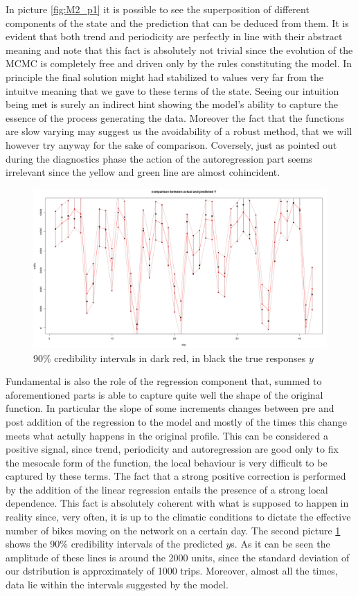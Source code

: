 \documentclass[11pt,twoside]{report}
\begin{document}
In picture \ref{fig:M2_p1} it is possible to see the superposition of different components of the state and the prediction that can be deduced from them. It is evident that both trend and periodicity are perfectly in line with their abstract meaning and note that this fact is absolutely not trivial since the evolution of the MCMC is completely free and driven only by the rules constituting the model. In principle the final solution might had stabilized to values very far from the intuitve meaning that we gave to these terms of the state. Seeing our intuition being met is surely an indirect hint showing the model's ability to capture the essence of the process generating the data. Moreover the fact that the functions are slow varying may suggest us the avoidability of a robust method, that we will however try anyway for the sake of comparison. Coversely, just as pointed out during the diagnostics phase the action of the autoregression part seems irrelevant since the yellow and green line are almost cohincident. 
\begin{figure}[H]
		\centering
		\includegraphics[width=150 mm]{pictures/m2_g2.png}
		\caption{90\% credibility intervals in dark red, in black the true responses $ y $}
		\label{fig:M2_p2}
\end{figure}
Fundamental is also the role of the regression component that, summed to aforementioned parts is able to capture quite well the shape of the original function. In particular the slope of some increments changes between pre and post addition of the regression to the model and mostly of the times this change meets what actully happens in the original profile. This can be considered a positive signal, since trend, periodicity and autoregression are good only to fix the mesocale form of the function, the local behaviour is very difficult to be captured by these terms. The fact that a strong positive correction is performed by the addition of the linear regression entails the presence of a strong local dependence. This fact is absolutely coherent with what is supposed to happen in reality since, very often, it is up to the climatic conditions to dictate the effective number of bikes moving on the network on a certain day. The second picture \ref{fig:M2_p2} shows the 90\% credibility intervals of the predicted $ y $s. As it can be seen the amplitude of these lines is around the 2000 units, since the standard deviation of our dstribution is approximately of 1000 trips. Moreover, almost all the times, data lie within the intervals suggested by the model.
\end{document}
